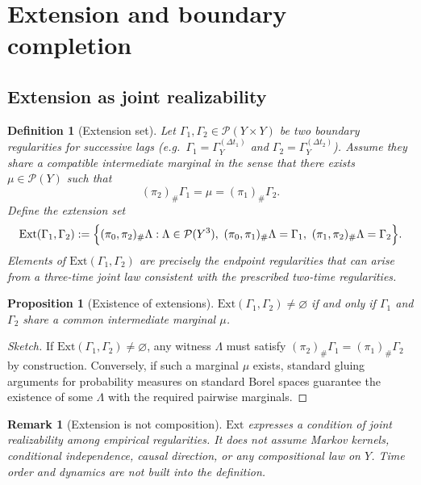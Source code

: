 \documentclass[11pt]{article}
\newtheorem{definition}{Definition}
\newtheorem{proposition}{Proposition}
\newtheorem{remark}{Remark}
\newcommand{\Ext}{\mathrm{Ext}} 	%
\begin{document}

\section{Extension and boundary completion}

\subsection{Extension as joint realizability}

\begin{definition}[Extension set]\label{def:ext-set}
Let $\Gamma_1,\Gamma_2\in\mathcal P(Y\times Y)$ be two boundary regularities for successive lags
(e.g.\ $\Gamma_1=\Gamma_Y^{(\Delta t_1)}$ and $\Gamma_2=\Gamma_Y^{(\Delta t_2)}$).
Assume they share a compatible intermediate marginal in the sense that there exists
$\mu\in\mathcal P(Y)$ such that
\[
(\pi_2)_\#\Gamma_1=\mu=(\pi_1)_\#\Gamma_2.
\]
Define the \emph{extension set}
\[
\Ext(\Gamma_1,\Gamma_2)
:=
\Bigl\{(\pi_0,\pi_2)_\#\Lambda :
\Lambda\in\mathcal P(Y^3),\
(\pi_0,\pi_1)_\#\Lambda=\Gamma_1,\
(\pi_1,\pi_2)_\#\Lambda=\Gamma_2
\Bigr\}.
\]
Elements of $\Ext(\Gamma_1,\Gamma_2)$ are precisely the endpoint regularities that can arise from
a three-time joint law consistent with the prescribed two-time regularities.
\end{definition}

\begin{proposition}[Existence of extensions]\label{prop:ext-existence}
$\Ext(\Gamma_1,\Gamma_2)\neq\varnothing$ if and only if $\Gamma_1$ and $\Gamma_2$ share a common
intermediate marginal $\mu$.
\end{proposition}

\begin{proof}[Sketch]
If $\Ext(\Gamma_1,\Gamma_2)\neq\varnothing$, any witness $\Lambda$ must satisfy
$(\pi_2)_\#\Gamma_1=(\pi_1)_\#\Gamma_2$ by construction.
Conversely, if such a marginal $\mu$ exists, standard gluing arguments for probability measures
on standard Borel spaces guarantee the existence of some $\Lambda$ with the required pairwise
marginals.
\end{proof}

\begin{remark}[Extension is not composition]\label{rem:ext-not-comp}
$\Ext$ expresses a condition of \emph{joint realizability} among empirical regularities.
It does not assume Markov kernels, conditional independence, causal direction, or any
compositional law on $Y$. Time order and dynamics are not built into the definition.
\end{remark}
\end{document}
